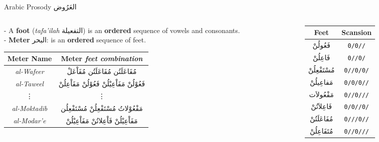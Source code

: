 \begin{frame}[fragile]{Arabic Prosody \textarabic{العَرُوض}}
\begin{columns}
	
	\begin{column}{.7\textwidth} %
		{\small 	
		- A \textbf{foot} (\textit{tafa'ilah} \textarabic{التفعيلة}) is an \textbf{ordered} sequence of vowels and consonants. \\
		- \textbf{Meter} \textarabic{البحر}: is an \textbf{ordered} sequence of \alert{feet}. }

		\begin{table}
		\small
				\begin{tabular}[h!]{|c|c|} 
			\hline
			\textbf{Meter Name} & \textbf{Meter} \small{\textit{feet combination}} \\ 
			\hline
			\textit{\alert{al-Wafeer}}    & \textarabic{مُفَاعَلَتُن مُفَاعَلَتُن مُفَاْعَلْ} \\ %
			\textit{al-Taweel}    & \textarabic{فَعُوْلُنْ مَفَاْعِيْلُنْ فَعُوْلُنْ مَفَاْعِلُنْ} \\ %
			\vdots                &  \vdots\\
			\textit{al-Moktadib}  & \textarabic{مَفْعُوْلاتُ مُسْتَفْعِلُنْ مُسْتَفْعِلُن} \\
			\textit{al-Modar'e}   & \textarabic{مَفَاْعِيْلُنْ فَاْعِلاتُنْ مَفَاْعِيْلُنْ} \\
			\hline
		\end{tabular}
		\end{table}
	\end{column}%
		\hfill%
		\begin{column}{.3 \textwidth}
			\begin{table}
				\small
			\begin{tabular}{|c|c|} \hline
			\textbf{Feet} & \textbf{Scansion} \\
			\hline
			\textarabic{فَعُولُنْ}  & \texttt{0/0//}\\
			\textarabic{فَاعِلُنْ}  & \texttt{0//0/}\\
			\textarabic{مُسْتَفْعِلُنْ}& \texttt{0//0/0/}\\
			\textarabic{مَفاعِيلُنْ}& \texttt{0/0/0//}\\
			\textarabic{مَفْعُولاَت} & \texttt{0//0///}\\
			\textarabic{فَاعِلاَتُنْ} & \texttt{0/0//0/}\\
			\textarabic{مُفَاعَلَتُنْ}& \texttt{0///0//}\\
			\textarabic{مُتَفَاعِلُنْ}& \texttt{0//0///}\\
			\hline
		\end{tabular}
		\end{table}		


\end{column}
\end{columns}
\end{frame}
